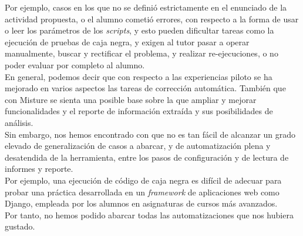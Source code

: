 Por ejemplo, casos en los que no se definió estrictamente en el enunciado de la actividad propuesta, o el alumno cometió errores, con respecto a la forma de usar o leer los parámetros de los \textit{scripts}, y esto pueden dificultar tareas como la ejecución de pruebas de caja negra, y exigen al tutor pasar a operar manualmente, buscar y rectificar el problema, y realizar re-ejecuciones, o no poder evaluar por completo al alumno.\\


En general, podemos decir que con respecto a las experiencias piloto se ha mejorado en varios aspectos las tareas de corrección automática. También que con Misture se sienta una posible base sobre la que ampliar y mejorar funcionalidades y el reporte de información extraída y sus posibilidades de análisis.\\

Sin embargo, nos hemos encontrado con que no es tan fácil de alcanzar un grado elevado de generalización de casos a abarcar, y de automatización plena y desatendida de la herramienta, entre los pasos de configuración y de lectura de informes y reporte.\\

Por ejemplo, una ejecución de código de caja negra es difícil de adecuar para probar una práctica desarrollada en un \textit{framework} de aplicaciones web como Django, empleada por los alumnos en asignaturas de cursos más avanzados.\\

Por tanto, no hemos podido abarcar todas las automatizaciones que nos hubiera gustado.\\


